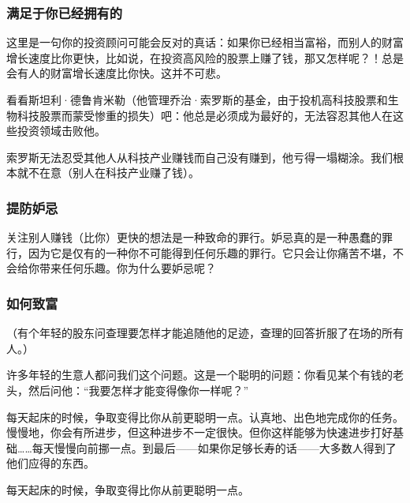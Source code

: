 \subsubsection*{满足于你已经拥有的}

这里是一句你的投资顾问可能会反对的真话：如果你已经相当富裕，而别人的财富增长速度比你更快，比如说，在投资高风险的股票上赚了钱，那又怎样呢？！总是会有人的财富增长速度比你快。这并不可悲。
\par

看看斯坦利·德鲁肯米勒（他管理乔治·索罗斯的基金，由于投机高科技股票和生物科技股票而蒙受惨重的损失）吧：他总是必须成为最好的，无法容忍其他人在这些投资领域击败他。
\par

索罗斯无法忍受其他人从科技产业赚钱而自己没有赚到，他亏得一塌糊涂。我们根本就不在意（别人在科技产业赚了钱）。
\par

\subsubsection*{提防妒忌}

关注别人赚钱（比你）更快的想法是一种致命的罪行。妒忌真的是一种愚蠢的罪行，因为它是仅有的一种你不可能得到任何乐趣的罪行。它只会让你痛苦不堪，不会给你带来任何乐趣。你为什么要妒忌呢？
\par

\subsubsection*{如何致富}

（有个年轻的股东问查理要怎样才能追随他的足迹，查理的回答折服了在场的所有人。）
\par

许多年轻的生意人都问我们这个问题。这是一个聪明的问题：你看见某个有钱的老头，然后问他：“我要怎样才能变得像你一样呢？”
\par

每天起床的时候，争取变得比你从前更聪明一点。认真地、出色地完成你的任务。慢慢地，你会有所进步，但这种进步不一定很快。但你这样能够为快速进步打好基础……每天慢慢向前挪一点。到最后——如果你足够长寿的话——大多数人得到了他们应得的东西。
\par

\begin{WisdomBox}
\par

每天起床的时候，争取变得比你从前更聪明一点。
\par
\end{WisdomBox}

